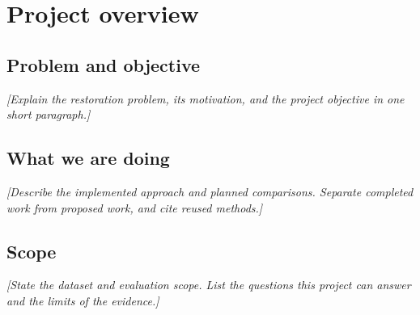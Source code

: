\chapter{Project overview}
\label{ch:01-project-overview}

\section{Problem and objective}
\textit{[Explain the restoration problem, its motivation, and the project objective in one short paragraph.]}

\section{What we are doing}
\textit{[Describe the implemented approach and planned comparisons. Separate completed work from proposed work, and cite reused methods.]}

\section{Scope}
\textit{[State the dataset and evaluation scope. List the questions this project can answer and the limits of the evidence.]}
